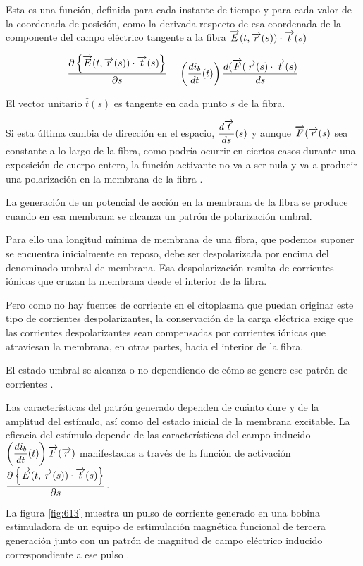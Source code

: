Esta es una función, definida para cada instante de tiempo y para cada valor de la coordenada de posición, como la derivada respecto de esa coordenada de la componente del campo eléctrico tangente a la fibra $\overrightarrow{E}(t, \overrightarrow{r}(s)) \cdot \overrightarrow{t}(s)$


\begin{equation}
	\dfrac{\partial \left\lbrace \overrightarrow{E}(t, \overrightarrow{r}(s)) \cdot \overrightarrow{t}(s) \right\rbrace }{\partial s} =\left( \dfrac{di_{b}}{dt}(t) \right) \dfrac{d(\overrightarrow{F}(\overrightarrow{r}(s) \cdot \overrightarrow{t}(s)}{ds}
\end{equation}

El vector unitario $\hat{t}(s)$ es tangente en cada punto $s$ de la fibra.

Si esta última cambia de dirección en el espacio, $\dfrac{d\overrightarrow{t}}{ds}(s)$ y aunque $\overrightarrow{F}(\overrightarrow{r}(s)$ sea constante a lo largo de la fibra, como podría ocurrir en ciertos casos durante una exposición de cuerpo entero, la función activante no va a ser nula y va a producir una polarización en la membrana de la fibra \citep{5627910}.

La generación de un potencial de acción en la membrana de la fibra se produce cuando en esa membrana se alcanza un patrón de polarización umbral.

Para ello una longitud mínima de membrana de una fibra, que podemos suponer se encuentra inicialmente en reposo, debe ser despolarizada por encima del denominado umbral de membrana.
Esa despolarización resulta de corrientes iónicas que cruzan la membrana desde el interior de la fibra.

Pero como no hay fuentes de corriente en el citoplasma que puedan originar este tipo de corrientes despolarizantes, la conservación de la carga eléctrica exige que las corrientes despolarizantes sean compensadas por corrientes iónicas que atraviesan la membrana, en otras partes, hacia el interior de la fibra.

El estado umbral se alcanza o no dependiendo de cómo se genere ese patrón de corrientes \citep{5627910}.

Las características del patrón generado dependen de cuánto dure y de la amplitud del estímulo, así como del estado inicial de la membrana excitable. La eficacia del estímulo depende de las características del campo inducido $\left( \dfrac{di_{b}}{dt}(t) \right)\overrightarrow{F}(\overrightarrow{r})$ manifestadas a través de la función de activación $\dfrac{\partial \left\lbrace \overrightarrow{E}(t, \overrightarrow{r}(s)) \cdot \overrightarrow{t}(s) \right\rbrace }{\partial s}$.

La figura \ref{fig:613} muestra un pulso de corriente generado en una bobina estimuladora de un equipo de estimulación magnética funcional de tercera generación junto con un patrón de magnitud de campo eléctrico inducido correspondiente a ese pulso \citep{4650502}.


